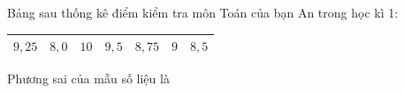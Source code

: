 \begin{ex}
Bảng sau thống kê điểm kiểm tra môn Toán của bạn An trong học kì 1:
\begin{center}
\begin{tabular}{|c|c|c|c|c|c|c|}\hline
$9{,}25$ & $8{,}0$ & $10$ & $9{,}5$ & $8{,}75$ & $9$ & $8{,}5$\\\hline
\end{tabular}
\end{center}
Phương sai của mẫu số liệu là
\end{ex}
